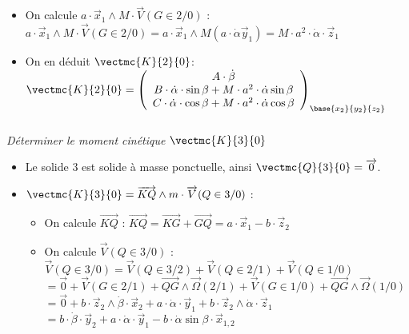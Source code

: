 \begin{multicols}{2}
\begin{corrige}
\begin{itemize}
\begin{itemize}
\item On calcule $a\cdot \overrightarrow{x}_1\wedge M\cdot \overrightarrow{V}(G\in 2/0)$ : 
$
a\cdot \overrightarrow{x}_1\wedge M\cdot \overrightarrow{V}(G\in 2/0)=
a\cdot \overrightarrow{x}_1\wedge M\left(a\cdot \dot{\alpha}\overrightarrow{y}_{1} \right)=
M\cdot a^2\cdot \dot{\alpha}\cdot \overrightarrow{z}_1
$

\item On en déduit $\vectmc{K}{2}{0}$: $
\vectmc{K}{2}{0}=\left(
\begin{array}{c}
A\cdot \dot{\beta}\\
B\cdot \dot{\alpha}\cdot \sin\beta+M\cdot a^2\cdot \dot{\alpha}\sin\beta\\
C\cdot \dot{\alpha}\cdot \cos\beta+M\cdot a^2\cdot \dot{\alpha}\cos\beta\\
\end{array}
\right)_{\base{{x}_2}{{y}_2}{{z}_2}}\\
$
\end{itemize}
\end{itemize}
\end{corrige}
\else
\fi


\subparagraph{} \textit{Déterminer le moment cinétique $\vectmc{K}{3}{0}$}
\ifprof
\begin{corrige}
\begin{itemize}
\item Le solide $3$ est solide à masse ponctuelle, ainsi $\vectmc{Q}{3}{0}=\overrightarrow{0}$.
\item $\vectmc{K}{3}{0}=\overrightarrow{KQ}\wedge m\cdot \overrightarrow{V}(Q\in 3/0)$ : 
\begin{itemize}
\item On calcule $\overrightarrow{KQ}$ : 
$
\overrightarrow{KQ}=\overrightarrow{KG}+\overrightarrow{GQ}=a\cdot \overrightarrow{x}_1-b\cdot \overrightarrow{z}_2
$
\item On calcule $\overrightarrow{V}(Q\in 3/0)$ : 
$
\overrightarrow{V}(Q\in 3/0)=\overrightarrow{V}(Q\in 3/2)+\overrightarrow{V}(Q\in 2/1)+\overrightarrow{V}(Q\in 1/0)
$
$=\overrightarrow{0}+\overrightarrow{V}(G\in 2/1)+\overrightarrow{QG}\wedge \overrightarrow{\Omega}(2/1)
+\overrightarrow{V}(G\in 1/0)+\overrightarrow{QG}\wedge \overrightarrow{\Omega}(1/0)$
$=\overrightarrow{0}+b\cdot \overrightarrow{z}_2\wedge \dot{\beta}\cdot \overrightarrow{x}_2+ a\cdot \dot{\alpha}\cdot \overrightarrow{y}_1+b\cdot \overrightarrow{z}_2\wedge \dot{\alpha}\cdot \overrightarrow{z}_1$
$=b\cdot \dot{\beta}\cdot \overrightarrow{y}_2+a\cdot \dot{\alpha}\cdot \overrightarrow{y}_1-b\cdot\dot{\alpha} \sin\beta\cdot \overrightarrow{x}_{1,2}$



\end{itemize}
\end{itemize}
\end{corrige}
\end{multicols}
